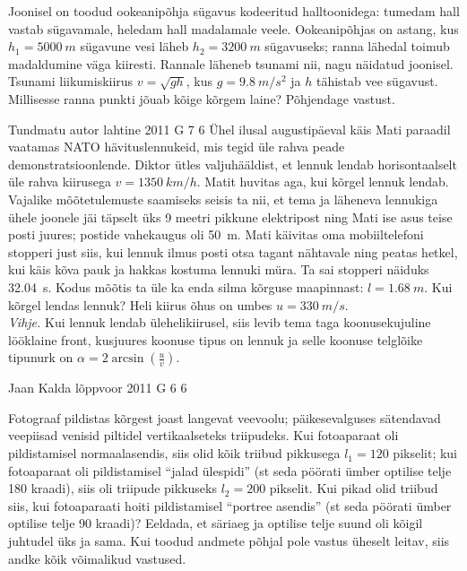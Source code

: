 \documentclass[11pt, twoside]{article}
\begin{document}
{{Joonisel on toodud ookeanipõhja sügavus kodeeritud halltoonidega: tumedam hall vastab sügavamale, heledam hall madalamale veele. Ookeanipõhjas on astang, kus $h_1 = \SI{5000}{m}$ sügavune vesi läheb $h_2 = \SI{3200}{m}$ sügavuseks; ranna lähedal toimub madaldumine väga kiiresti. Rannale läheneb tsunami nii, nagu näidatud joonisel. Tsunami liikumiskiirus $v = \sqrt{gh}$, kus $g = \SI{9,8}{m/s^2}$ ja $h$ tähistab vee sügavust. Millisesse ranna punkti jõuab kõige kõrgem laine? Põhjendage vastust.
\fi
}

{Tundmatu autor} %
{lahtine} %
{2011} %
{G 7} %
{6} %
{
\ifStatement
Ühel ilusal augustipäeval käis Mati paraadil vaatamas NATO hävituslennukeid, mis
tegid üle rahva peade demonstratsioonlende. Diktor ütles valjuhääldist, et lennuk
lendab horisontaalselt üle rahva kiirusega $v=\SI{1350}{km/h}$. Matit huvitas aga, kui
kõrgel lennuk lendab. Vajalike mõõtetulemuste saamiseks seisis ta nii, et tema
ja läheneva lennukiga ühele joonele jäi täpselt üks 9 meetri pikkune elektripost
ning Mati ise asus teise posti juures; postide vahekaugus oli \SI{50}{m}. Mati käivitas oma
mobiiltelefoni stopperi just siis, kui lennuk ilmus posti otsa tagant nähtavale ning 
peatas hetkel, kui käis kõva pauk ja hakkas kostuma lennuki müra. Ta sai
stopperi näiduks \SI{32,04}{s}. Kodus
mõõtis ta üle ka enda silma kõrguse maapinnast: $l=\SI{1,68}{m}$.
Kui kõrgel lendas lennuk? Heli kiirus õhus on umbes
$u=\SI{330}{m/s}$.\\ 
\textit{Vihje.} Kui lennuk lendab
ülehelikiirusel, siis levib tema taga
koonusekujuline lööklaine front, kusjuures koonuse tipus on lennuk ja selle
koonuse telglõike
tipunurk on $\alpha=2\arcsin\left(\frac{u}{v}\right)$.
\fi
}

{Jaan Kalda} %
{lõppvoor} %
{2011} %
{G 6} %
{6} %
{
\ifStatement
Fotograaf pildistas kõrgest joast langevat veevoolu; päikesevalguses sätendavad veepiisad venisid piltidel vertikaalseteks triipudeks.
Kui fotoaparaat oli pildistamisel normaalasendis, siis olid kõik triibud pikkusega $l_1 = \num{120}$ pikselit; kui fotoaparaat oli pildistamisel \enquote{jalad ülespidi} (st seda
pöörati ümber optilise telje \num{180} kraadi), siis oli triipude pikkuseks $l_2 = \num{200}$
pikselit. Kui pikad olid triibud siis, kui fotoaparaati hoiti pildistamisel \enquote{portree
asendis} (st seda pöörati ümber optilise telje \num{90} kraadi)? Eeldada, et säriaeg
ja optilise telje suund oli kõigil juhtudel üks ja sama. Kui toodud andmete
põhjal pole vastus üheselt leitav, siis andke kõik võimalikud vastused.

}}
\end{document}

